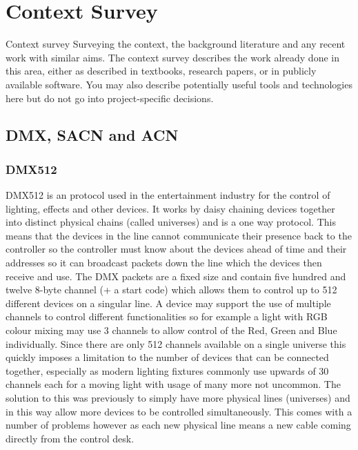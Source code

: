 \documentclass[11pt,a4paper,notitlepage]{report}
\begin{document}
	
	\section{Context Survey}
	Context survey
	Surveying the context, the background literature and
	any recent work with similar aims. The context survey
	describes the work already done in this area, either as
	described in textbooks, research papers, or in publicly
	available software. You may also describe potentially
	useful tools and technologies here but do not go into
	project-specific decisions.
	
	\subsection{DMX, SACN and ACN}
	\subsubsection{DMX512} DMX512 is an protocol used in the entertainment industry for the control of lighting, effects and other devices. It works by daisy chaining devices together into distinct physical chains (called universes) and is a one way protocol. This means that the devices in the line cannot communicate their presence back to the controller so the controller must know about the devices ahead of time and their addresses so it can broadcast packets down the line which the devices then receive and use. The DMX packets are a fixed size and contain five hundred and twelve 8-byte channel (+ a start code) which allows them to control up to 512 different devices on a singular line. A device may support the use of multiple channels to control different functionalities so for example a light with RGB colour mixing may use 3 channels to allow control of the Red, Green and Blue individually. Since there are only 512 channels available on a single universe this quickly imposes a limitation to the number of devices that can be connected together, especially as modern lighting fixtures commonly use upwards of 30 channels each for a moving light with usage of many more not uncommon. The solution to this was previously to simply have more physical lines (universes) and in this way allow more devices to be controlled simultaneously. This comes with a number of problems however as each new physical line means a new cable coming directly from the control desk.
	
\end{document}
